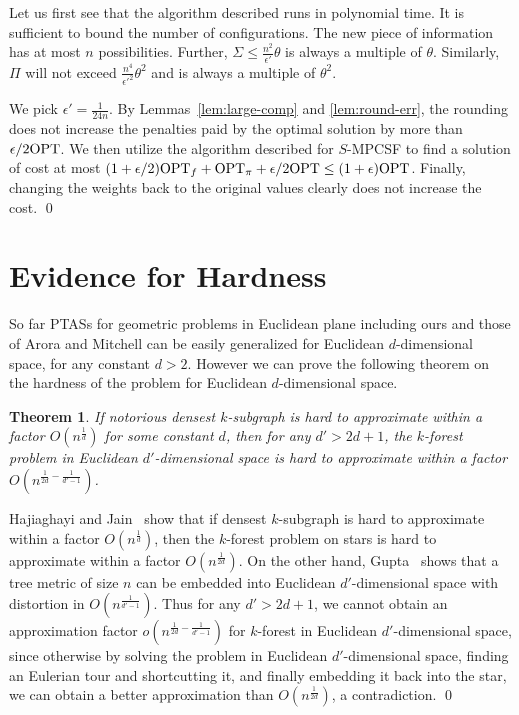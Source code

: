 \documentclass[extras,11pt]{article} \usepackage{fullpage}
\theoremstyle{mytheorem}
\newtheorem{theorem}{Theorem}
\renewenvironment{proof}{\par\noindent{\bf Proof.}\hspace{0.5em}}
    {\hfill\qed\vspace{1ex}}
\newenvironment{proofof}[1]{\par\noindent{\bf #1.}\hspace{0.5em}}
    {\hfill\qed\vspace{1ex}}
\newcommand{\eps}{\epsilon}
\newcommand{\OPT}{\mbox{\rm OPT}}
\begin{document}
\begin{proofof}{\proofname\ of Theorem~\ref{thm:mpcsf}}
Let us first see that the algorithm described runs in polynomial time.
It is sufficient to bound the number of configurations.
The new piece of information has at most $n$ possibilities.
Further, $\Sigma \leq \frac{n^2}{\eps'}\theta$ is always a multiple of $\theta$.
Similarly, $\Pi$ will not exceed $\frac{n^4}{\eps'^2}\theta^2$ and is always a multiple of $\theta^2$.

 We pick $\eps'=\frac{1}{24n}$.
  By Lemmas~\ref{lem:large-comp} and \ref{lem:round-err}, the rounding does not increase the penalties paid by the optimal solution by more than $\eps/2\OPT$.
 We then utilize the algorithm described for $S$-MPCSF to find a solution of cost at most $(1+\eps/2)\OPT_f + \OPT_\pi +\eps/2\OPT \leq (1+\eps)\OPT$.
Finally,  changing the weights back to the original values clearly does not increase the cost.
\end{proofof}






\section{Evidence for Hardness}\label{sec:challenge}

So far PTASs for geometric problems in Euclidean plane including
ours and those of Arora \cite{arora98:ptas} and Mitchell
\cite{cr:26} can be easily generalized for Euclidean $d$-dimensional
space, for any constant $d> 2$. However we can prove the following
theorem on the hardness of the problem for Euclidean $d$-dimensional
space.

\begin{theorem}
If notorious densest $k$-subgraph is hard to approximate within a
factor $O(n^{\frac{1}{d}})$ for some constant $d$, then for any $d'>
2d+1$, the $k$-forest problem in Euclidean $d'$-dimensional space is
hard to approximate within a factor
$O(n^{\frac{1}{2d}-\frac{1}{d'-1}})$.
\end{theorem}
\begin{proof}
Hajiaghayi and Jain~\cite{HJ06} show that if densest $k$-subgraph is
hard to approximate within a factor $O(n^{\frac{1}{d}})$, then the
$k$-forest problem on stars is hard to approximate within a factor
$O(n^{\frac{1}{2d}})$. On the other hand, Gupta~\cite{Gupta00} shows
that a tree metric of size $n$ can be embedded into Euclidean
$d'$-dimensional space with distortion in $O(n^{\frac{1}{d'-1}})$.
Thus for any $d'> 2d+1$, we cannot obtain an approximation factor
$o(n^{\frac{1}{2d}-\frac{1}{d'-1}})$ for $k$-forest in Euclidean
$d'$-dimensional space, since otherwise by solving the problem in
Euclidean $d'$-dimensional space, finding an Eulerian tour and
shortcutting it, and finally embedding it back into the star, we can
obtain a better approximation than $O(n^{\frac{1}{2d}})$, a
contradiction.
\end{proof}
\end{document}
